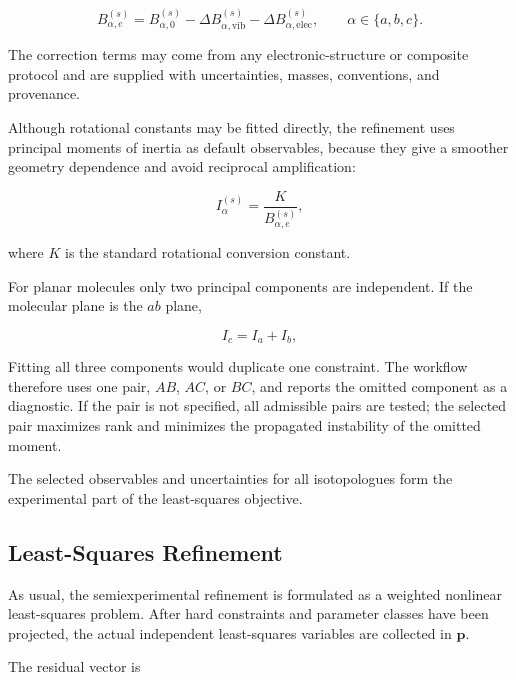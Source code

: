 \documentclass[aip,jcp,reprint,longbibliography,floatfix]{revtex4-2}
\begin{document}
\begin{equation}
B_{\alpha,e}^{(s)}
= B_{\alpha,0}^{(s)}
- \Delta B_{\alpha,\mathrm{vib}}^{(s)}
- \Delta B_{\alpha,\mathrm{elec}}^{(s)},
\qquad
\alpha \in \{a,b,c\}.
\end{equation}

The correction terms may come from any electronic-structure or composite
protocol and are supplied with uncertainties, masses, conventions, and
provenance.\cite{Mendolicchio2025FastDvib}

Although rotational constants may be fitted directly, the refinement uses
principal moments of inertia as default observables, because they give a smoother 
geometry dependence and avoid reciprocal amplification: 

\begin{equation}
I_{\alpha}^{(s)}
=
\frac{K}
{B_{\alpha,e}^{(s)}},
\end{equation}

where $K$ is the standard rotational conversion constant.

For planar molecules only two principal components are independent. If the
molecular plane is the $ab$ plane,

\begin{equation}
I_c = I_a + I_b ,
\end{equation}

Fitting all three components would duplicate one constraint. The workflow
therefore uses one pair, $AB$, $AC$, or $BC$, and reports the omitted component
as a diagnostic. If the pair is not specified, all admissible pairs are tested;
the selected pair maximizes rank and minimizes the propagated instability of
the omitted moment.

The selected observables and uncertainties for all isotopologues form the
experimental part of the least-squares objective.


\subsection{Least-Squares Refinement}

As usual,\cite{Demaison2011EquilibriumStructures,Mendolicchio2017MSR} the semiexperimental 
refinement is formulated as a weighted nonlinear least-squares problem. 
After hard constraints and parameter classes have been projected, the actual independent 
least-squares variables are collected in $\mathbf{p}$.

The residual vector is
\end{document}
